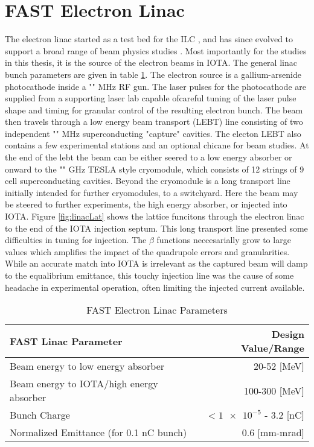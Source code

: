 \section{FAST Electron Linac}
The electron linac started as a test bed for the ILC \cite{fermiILC,recordGradient}, and has since evolved to support a broad range of beam physics studies \cite{fastGreens,NEB}. Most importantly for the studies in this thesis, it is the source of the electron beams in IOTA. The general linac bunch parameters are given in table \ref{tab:linac}. The electron source is a gallium-arsenide photocathode inside a "" MHz RF gun. The laser pulses for the photocathode are supplied from a supporting laser lab capable ofcareful tuning of the laser pulse shape and timing for granular control of the resulting electron bunch. The beam then travels through a low energy beam transport (LEBT) line consisting of two independent "" MHz superconducting "capture" cavities. The electon LEBT also contains a few experimental stations and an optional chicane for beam studies. At the end of the lebt the beam can be either seered to a low energy absorber or onward to the "" GHz TESLA style cryomodule, which consists of 12 strings of 9 cell superconducting cavities. Beyond the cryomodule is a long transport line initially intended for further cryomodules, to a switchyard. Here the beam may be steered to further experiments, the high energy absorber, or injected into IOTA. Figure \ref{fig:linacLat} shows the lattice funcitons through the electron linac to the end of the IOTA injection septum. This long transport line presented some difficulties in tuning for injection. The $\beta$ functions neccesarially grow to large values which amplifies the impact of the quadrupole errors and granularities. While an accurate match into IOTA is irrelevant as the captured beam will damp to the equalibrium emittance, this touchy injection line was the cause of some headache in experimental operation, often limiting the injected current available.

\begin{table}
    \centering
    \begin{tabular}{lr}
    \toprule
    \textbf{FAST Linac Parameter} & \textbf{Design Value/Range}\\
    \midrule
    Beam energy to low energy absorber & 20-52 [MeV]\\
    Beam energy to IOTA/high energy absorber & 100-300 [MeV]\\
    Bunch Charge & $<\num{1e-5}$ - 3.2 [nC]\\
    Normalized Emittance (for 0.1 nC bunch) & 0.6 [mm-mrad]\\
    \bottomrule
    \end{tabular}
    \caption{FAST Electron Linac Parameters}
    \label{tab:linac}
\end{table}

